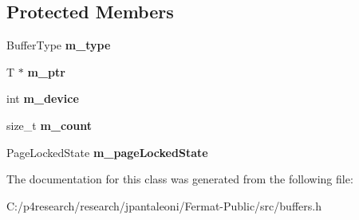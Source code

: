 \subsection*{Protected Members}
\begin{DoxyCompactItemize}
\item 
\mbox{\label{class_buffer_aa781dd1b7d878f102a143eefb2f09ec3}} 
Buffer\+Type {\bfseries m\+\_\+type}
\item 
\mbox{\label{class_buffer_a4ca3e715a85c41be1610a3e039e613a7}} 
T $\ast$ {\bfseries m\+\_\+ptr}
\item 
\mbox{\label{class_buffer_a57c5c20d61761a35df1cc2acaf85707e}} 
int {\bfseries m\+\_\+device}
\item 
\mbox{\label{class_buffer_a50b578484061644b57c71e20e0f192ae}} 
size\+\_\+t {\bfseries m\+\_\+count}
\item 
\mbox{\label{class_buffer_aa721dc5a6930c3f4f549e39ea54ae1f6}} 
Page\+Locked\+State {\bfseries m\+\_\+page\+Locked\+State}
\end{DoxyCompactItemize}


The documentation for this class was generated from the following file\+:\begin{DoxyCompactItemize}
\item 
C\+:/p4research/research/jpantaleoni/\+Fermat-\/\+Public/src/buffers.\+h\end{DoxyCompactItemize}
